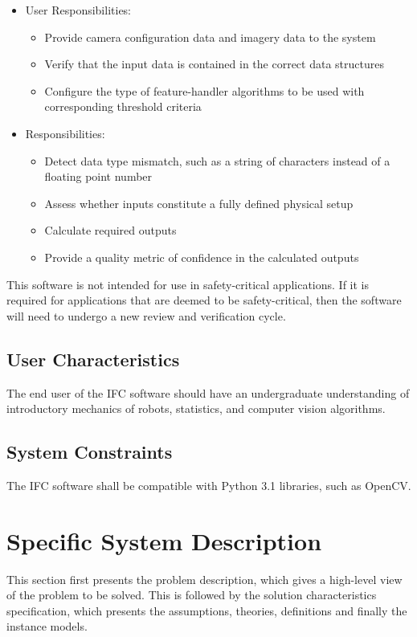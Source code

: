 \documentclass[12pt]{article}
\begin{document}
\begin{itemize}
\item User Responsibilities:
\begin{itemize}
\item Provide camera configuration data and imagery data to the system
\item Verify that the input data is contained in the correct data structures
\item Configure the type of feature-handler algorithms to be used with corresponding 
threshold criteria
\end{itemize}
\item \progname{} Responsibilities:
\begin{itemize}
\item Detect data type mismatch, such as a string of characters instead of a
  floating point number
\item Assess whether inputs constitute a fully defined physical setup
\item Calculate required outputs
\item Provide a quality metric of confidence in the calculated outputs
\end{itemize}
\end{itemize}

This software is not intended for use in safety-critical applications. If it is required for 
applications that are deemed to be safety-critical, then the software will need to undergo a new 
review and verification cycle.

\subsection{User Characteristics} \label{SecUserCharacteristics}
The end user of the IFC software should have an undergraduate understanding of introductory 
mechanics of robots, statistics, and computer vision algorithms.

\subsection{System Constraints}
The IFC software shall be compatible with Python 3.1 libraries, such as
OpenCV.

\section{Specific System Description}
This section first presents the problem description, which gives a high-level
view of the problem to be solved.  This is followed by the solution characteristics
specification, which presents the assumptions, theories, definitions and finally
the instance models. 
\end{document}
